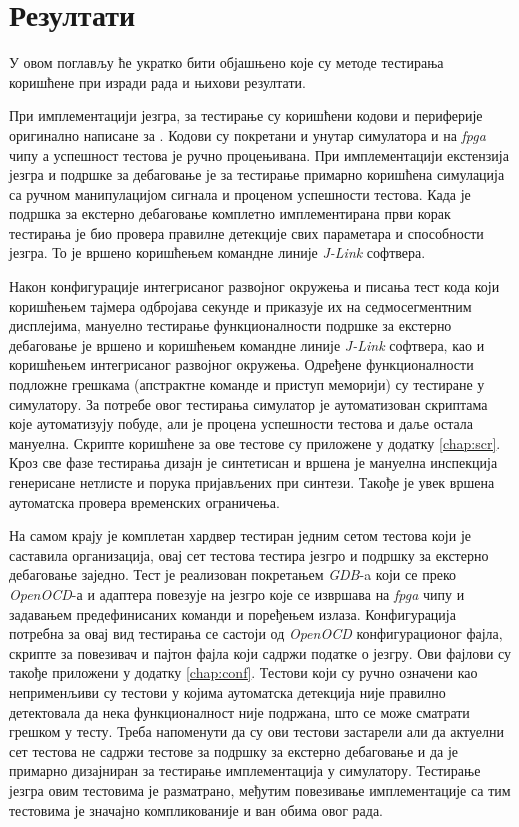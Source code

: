 \chapter{Резултати}

У овом поглављу ће укратко бити објашњено које су методе тестирања коришћене при изради рада и њихови резултати.

При имплементацији језгра, за тестирање су коришћени кодови и периферије оригинално написане за \cite{arilla}. Кодови су покретани и унутар симулатора и на \textit{\acrshort{fpga}} чипу а успешност тестова је ручно процењивана.
При имплементацији екстензија језгра и подршке за дебаговање је за тестирање примарно коришћена симулација са ручном манипулацијом сигнала и проценом успешности тестова.
Када је подршка за екстерно дебаговање комплетно имплементирана први корак тестирања је био провера правилне детекције свих параметара и способности језгра. То је вршено коришћењем командне линије \textit{J-Link} софтвера.



Након конфигурације интегрисаног развојног окружења и писања тест кода који коришћењем тајмера одбројава секунде и приказује их на седмосегментним дисплејима, мануелно тестирање функционалности подршке за екстерно дебаговање је вршено и коришћењем командне линије \textit{J-Link} софтвера, као и коришћењем интегрисаног развојног окружења.
Одређене функционалности подложне грешкама (апстрактне команде и приступ меморији) су тестиране у симулатору. За потребе овог тестирања симулатор је аутоматизован скриптама које аутоматизују побуде, али је процена успешности тестова и даље остала мануелна. Скрипте коришћене за ове тестове су приложене у додатку \ref{chap:scr}.
Кроз све фазе тестирања дизајн је синтетисан и вршена је мануелна инспекција генерисане нетлисте и порука пријављених при синтези. Такође је увек вршена аутоматска провера временских ограничења.

На самом крају је комплетан хардвер тестиран једним сетом тестова који је саставила  организација, овај сет тестова тестира језгро и подршку за екстерно дебаговање заједно.
Тест је реализован покретањем \textit{\acrshort{GDB}}-a који се преко \textit{Open\acrshort{OCD}}-а и адаптера повезује на језгро које се извршава на \textit{\acrshort{fpga}} чипу и задавањем предефинисаних команди и поређењем излаза. Конфигурација потребна за овај вид тестирања се састоји од \textit{Open\acrshort{OCD}} конфигурационог фајла, скрипте за повезивач и пајтон фајла који садржи податке о језгру. Ови фајлови су такође приложени у додатку \ref{chap:conf}. Тестови који су ручно означени као неприменљиви су тестови у којима аутоматска детекција није правилно детектовала да нека функционалност није подржана, што се може сматрати грешком у тесту. Треба напоменути да су ови тестови застарели али да актуелни сет тестова не садржи тестове за подршку за екстерно дебаговање и да је примарно дизајниран за тестирање имплементација у симулатору. Тестирање језгра овим тестовима је разматрано, међутим повезивање имплементације са тим тестовима је значајно компликованије и ван обима овог рада.

